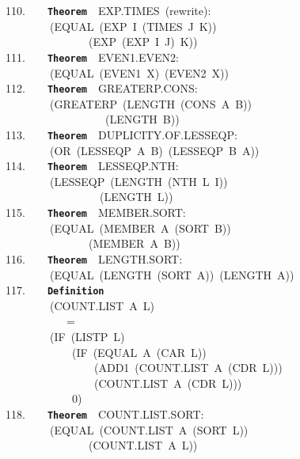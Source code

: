 \documentclass[11pt]{book}
\newenvironment{pubasis}{\begin{flushleft}\ttfamily\small}{\normalsize\rmfamily\end{flushleft}}
\newcommand{\axiomordefinition}[1]{\vspace{6pt}\texttt{\textbf{#1}}}
\begin{document}
\begin{pubasis}
110.~~~~\axiomordefinition{Theorem}~~EXP.TIMES~(rewrite):\\
~~~~~~~~(EQUAL~(EXP~I~(TIMES~J~K))\\
~~~~~~~~~~~~~~~(EXP~(EXP~I~J)~K))\\

111.~~~~\axiomordefinition{Theorem}~~EVEN1.EVEN2:\\
~~~~~~~~(EQUAL~(EVEN1~X)~(EVEN2~X))\\

112.~~~~\axiomordefinition{Theorem}~~GREATERP.CONS:\\
~~~~~~~~(GREATERP~(LENGTH~(CONS~A~B))\\
~~~~~~~~~~~~~~~~~~(LENGTH~B))\\

113.~~~~\axiomordefinition{Theorem}~~DU\-PLI\-CI\-TY.OF.LESSEQP:\\
~~~~~~~~(OR~(LESSEQP~A~B)~(LESSEQP~B~A))\\

114.~~~~\axiomordefinition{Theorem}~~LESSEQP.NTH:\\
~~~~~~~~(LESSEQP~(LENGTH~(NTH~L~I))\\
~~~~~~~~~~~~~~~~~(LENGTH~L))\\

115.~~~~\axiomordefinition{Theorem}~~MEMBER.SORT:\\
~~~~~~~~(EQUAL~(MEMBER~A~(SORT~B))\\
~~~~~~~~~~~~~~~(MEMBER~A~B))\\

116.~~~~\axiomordefinition{Theorem}~~LENGTH.SORT:\\
~~~~~~~~(EQUAL~(LENGTH~(SORT~A))~(LENGTH~A))\\

117.~~~~\axiomordefinition{Definition}\\
~~~~~~~~(COUNT.LIST~A~L)\\
~~~~~~~~~~~=\\
~~~~~~~~(IF~(LISTP~L)\\
~~~~~~~~~~~~(IF~(EQUAL~A~(CAR~L))\\
~~~~~~~~~~~~~~~~(ADD1~(COUNT.LIST~A~(CDR~L)))\\
~~~~~~~~~~~~~~~~(COUNT.LIST~A~(CDR~L)))\\
~~~~~~~~~~~~0)\\

118.~~~~\axiomordefinition{Theorem}~~COUNT.LIST.SORT:\\
~~~~~~~~(EQUAL~(COUNT.LIST~A~(SORT~L))\\
~~~~~~~~~~~~~~~(COUNT.LIST~A~L))\\


\end{pubasis}
\end{document}
